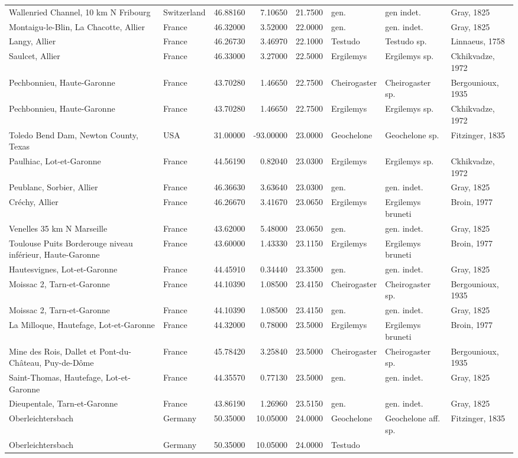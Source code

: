 \documentclass[]{article}
\begin{document}
\begin{longtable}[]{@{}llrrrlll@{}}
Wallenried Channel, 10 km N Fribourg & Switzerland & 46.88160 & 7.10650
& 21.7500 & gen. & gen indet. & Gray, 1825\tabularnewline
Montaigu-le-Blin, La Chacotte, Allier & France & 46.32000 & 3.52000 &
22.0000 & gen. & gen. indet. & Gray, 1825\tabularnewline
Langy, Allier & France & 46.26730 & 3.46970 & 22.1000 & Testudo &
Testudo sp. & Linnaeus, 1758\tabularnewline
Saulcet, Allier & France & 46.33000 & 3.27000 & 22.5000 & Ergilemys &
Ergilemys sp. & Ckhikvadze, 1972\tabularnewline
Pechbonnieu, Haute-Garonne & France & 43.70280 & 1.46650 & 22.7500 &
Cheirogaster & Cheirogaster sp. & Bergounioux, 1935\tabularnewline
Pechbonnieu, Haute-Garonne & France & 43.70280 & 1.46650 & 22.7500 &
Ergilemys & Ergilemys sp. & Ckhikvadze, 1972\tabularnewline
Toledo Bend Dam, Newton County, Texas & USA & 31.00000 & -93.00000 &
23.0000 & Geochelone & Geochelone sp. & Fitzinger, 1835\tabularnewline
Paulhiac, Lot-et-Garonne & France & 44.56190 & 0.82040 & 23.0300 &
Ergilemys & Ergilemys sp. & Ckhikvadze, 1972\tabularnewline
Peublanc, Sorbier, Allier & France & 46.36630 & 3.63640 & 23.0300 & gen.
& gen. indet. & Gray, 1825\tabularnewline
Créchy, Allier & France & 46.26670 & 3.41670 & 23.0650 & Ergilemys &
Ergilemys bruneti & Broin, 1977\tabularnewline
Venelles 35 km N Marseille & France & 43.62000 & 5.48000 & 23.0650 &
gen. & gen. indet. & Gray, 1825\tabularnewline
Toulouse Puits Borderouge niveau inférieur, Haute-Garonne & France &
43.60000 & 1.43330 & 23.1150 & Ergilemys & Ergilemys bruneti & Broin,
1977\tabularnewline
Hautesvignes, Lot-et-Garonne & France & 44.45910 & 0.34440 & 23.3500 &
gen. & gen. indet. & Gray, 1825\tabularnewline
Moissac 2, Tarn-et-Garonne & France & 44.10390 & 1.08500 & 23.4150 &
Cheirogaster & Cheirogaster sp. & Bergounioux, 1935\tabularnewline
Moissac 2, Tarn-et-Garonne & France & 44.10390 & 1.08500 & 23.4150 &
gen. & gen. indet. & Gray, 1825\tabularnewline
La Milloque, Hautefage, Lot-et-Garonne & France & 44.32000 & 0.78000 &
23.5000 & Ergilemys & Ergilemys bruneti & Broin, 1977\tabularnewline
Mine des Rois, Dallet et Pont-du-Château, Puy-de-Dôme & France &
45.78420 & 3.25840 & 23.5000 & Cheirogaster & Cheirogaster sp. &
Bergounioux, 1935\tabularnewline
Saint-Thomas, Hautefage, Lot-et-Garonne & France & 44.35570 & 0.77130 &
23.5000 & gen. & gen. indet. & Gray, 1825\tabularnewline
Dieupentale, Tarn-et-Garonne & France & 43.86190 & 1.26960 & 23.5150 &
gen. & gen. indet. & Gray, 1825\tabularnewline
Oberleichtersbach & Germany & 50.35000 & 10.05000 & 24.0000 & Geochelone
& Geochelone aff. sp. & Fitzinger, 1835\tabularnewline
Oberleichtersbach & Germany & 50.35000 & 10.05000 & 24.0000 & Testudo &

\end{longtable}
\end{document}
